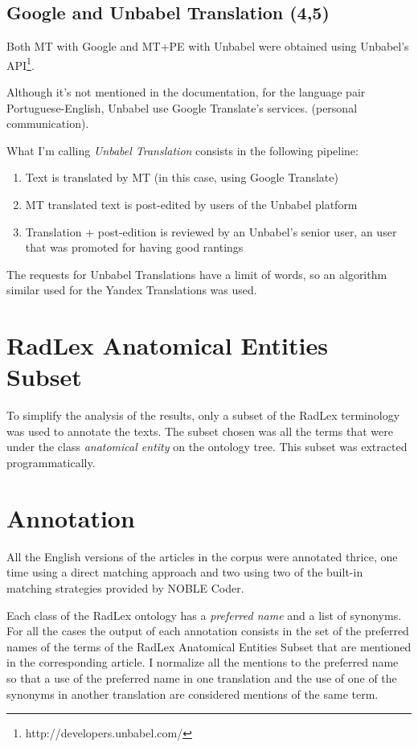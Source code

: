 \subsection{Google and Unbabel Translation (4,5)}

Both MT with Google and MT+PE with Unbabel were obtained using Unbabel's API\footnote{http://developers.unbabel.com/}. 

Although it's not mentioned in the documentation, for the language pair Portuguese-English, Unbabel use Google Translate's services. (personal communication).

What I'm calling \textit{Unbabel Translation} consists in the following pipeline:

\begin{enumerate}
\item Text is translated by MT (in this case, using Google Translate)
\item MT translated text is post-edited by users of the Unbabel platform 
\item Translation + post-edition is reviewed by an Unbabel's senior user, an user that was promoted for having good rantings
\end{enumerate}

The requests for Unbabel Translations have a limit of words, so an algorithm similar used for the Yandex Translations was used. 

\section{RadLex Anatomical Entities Subset}

To simplify the analysis of the results, only a subset of the RadLex terminology was used to annotate the texts. The subset chosen was all the terms that were under the class \textit{anatomical entity} on the ontology tree. This subset was extracted programmatically. 

\section{Annotation}

All the English versions of the articles in the corpus were annotated thrice, one time using a direct matching approach and two using two of the built-in matching strategies provided by NOBLE Coder. 

Each class of the RadLex ontology has a \textit{preferred name} and a list of synonyms. For all the cases the output of each annotation consists in the set of the preferred names of the terms of the RadLex Anatomical Entities Subset that are mentioned in the corresponding article. I normalize all the mentions to the preferred name so that a use of the preferred name in one translation and the use of one of the synonyms in another translation are considered mentions of the same term. 

